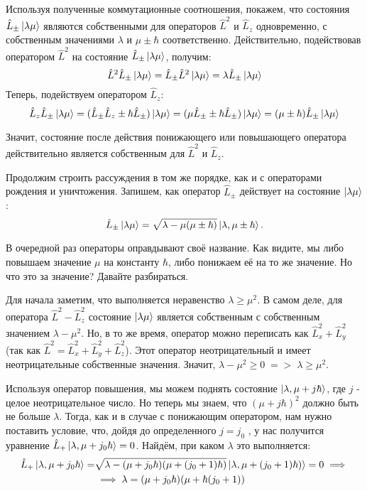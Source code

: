 Используя полученные коммутационные соотношения, покажем, что состояния $\hat{L}_{\pm}\ket{\lambda\mu}$ являются собственными для операторов $\hat{L}^2$ и $\hat{L}_z$ одновременно, с собственным значениями $\lambda$ и $\mu \pm \hbar$ соответственно. Действительно, подействовав оператором $\hat{L}^2$ на состояние $\hat{L}_{\pm}\ket{\lambda\mu}$, получим:
\[
\hat{L}^2\hat{L}_{\pm}\ket{\lambda\mu} = \hat{L}_{\pm}\hat{L}^2\ket{\lambda\mu} = \lambda\hat{L}_{\pm}\ket{\lambda\mu}
\]
Теперь, подействуем оператором $\hat{L}_z$:
\[
\hat{L}_z\hat{L}_{\pm}\ket{\lambda\mu} = (\hat{L}_{\pm}\hat{L}_z \pm \hbar\hat{L}_{\pm})\ket{\lambda\mu} = (\mu\hat{L}_{\pm} \pm \hbar\hat{L}_{\pm})\ket{\lambda\mu} = (\mu \pm \hbar)\hat{L}_{\pm}\ket{\lambda\mu}
\]

Значит, состояние после действия понижающего или повышающего оператора действительно является собственным для $\hat{L}^2$ и $\hat{L}_z$.

Продолжим строить рассуждения в том же порядке, как и с операторами рождения и уничтожения. Запишем, как оператор $\hat{L}_{\pm}$ действует  на состояние $\ket{\lambda\mu}$:
\[
\hat{L}_{\pm}\ket{\lambda\mu} = \sqrt{\lambda - \mu(\mu \pm \hbar)}\ket{\lambda,\mu\pm\hbar}.
\]

В очередной раз операторы оправдывают своё название. Как видите, мы либо повышаем значение $\mu$ на константу $\hbar$, либо понижаем её на то же значение. Но что это за значение? Давайте разбираться.

Для начала заметим, что выполняется неравенство $\lambda \geq \mu^2$. В самом деле, для оператора $\hat{L}^2 - \hat{L}^2_z$ состояние $\ket{\lambda\mu}$ является собственным с собственным значением $\lambda - \mu^2$. Но, в то же время, оператор можно переписать как $\hat{L}^2_x + \hat{L}^2_y$ (так как $\hat{L}^2 = \hat{L}^2_x + \hat{L}^2_y + \hat{L}^2_z$). Этот оператор неотрицательный и имеет неотрицательные собственные значения. Значит, $\lambda - \mu^2 \geq 0\; => \; \lambda \geq \mu^2$.

Используя оператор повышения, мы можем поднять состояние $\ket{\lambda,\mu + j\hbar}$, где $j$ - целое неотрицательное число. Но теперь мы знаем, что $(\mu + j\hbar)^2$ должно быть не больше $\lambda$. Тогда, как и в случае с понижающим оператором, нам нужно поставить условие, что, дойдя до определенного $j = j_0$ , у нас получится уравнение $\hat{L}_+\ket{\lambda, \mu + j_0\hbar} = 0$. Найдём, при каком $\lambda$ это выполняется:
\begin{align*}
\hat{L}_{+}\ket{\lambda,\mu + j_0\hbar} = &\sqrt{\lambda - (\mu+j_0\hbar)(\mu + (j_0 + 1)\hbar)}\ket{\lambda,\mu +(j_0 + 1)\hbar)} = 0 \implies \\ 
& \implies  \lambda = (\mu + j_0\hbar)(\mu + \hbar(j_0 + 1))
\end{align*}

